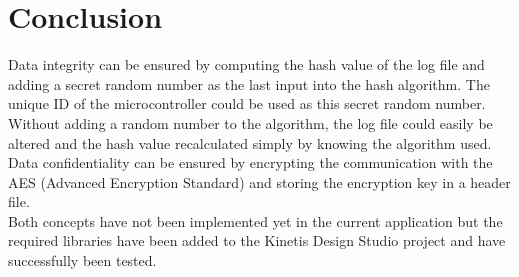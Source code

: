 \section{Conclusion}
Data integrity can be ensured by computing the hash value of the log file and adding a secret random number as the last input into the hash algorithm. The unique ID of the microcontroller could be used as this secret random number. Without adding a random number to the algorithm, the log file could easily be altered and the hash value recalculated simply by knowing the algorithm used.\\
Data confidentiality can be ensured by encrypting the communication with the AES (Advanced Encryption Standard) and storing the encryption key in a header file.\\
Both concepts have not been implemented yet in the current application but the required libraries have been added to the Kinetis Design Studio project and have successfully been tested.
%
%
%
%
%